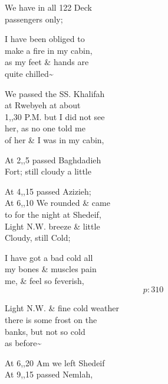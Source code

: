 \documentclass{report}
\begin{document}
	\par{
 	We have in all 122 Deck\ \\passengers only;\ \\
	}

	\par{
 	I have been obliged to\ \\make a fire in my cabin,\ \\as my feet \& hands are\ \\quite chilled\~{}\ \\
	}

	\par{
 	We passed the SS. Khalifah\ \\at Rwebyeh at about\ \\1,,30 P.M. but I did not see\ \\her, as no one told me\ \\of her \& I was in my cabin,\ \\
	}

	\par{
 	At 2,,5 passed Baghdadieh\ \\Fort; still cloudy a little\ \\
	}

	\par{
 	At 4,,15 passed Azizieh;\ \\At 6,,10 We rounded \& came\ \\to for the night at Shedeif,\ \\Light N.W. breeze \& little\ \\Cloudy, still Cold;\ \\
	}

	\par{
 	I have got a bad cold all\ \\my bones \& muscles pain\ \\me, \& feel so feverish,\ \\
  \[p: 310 \]

	}

	\par{
 	Light N.W. \& fine cold weather\ \\there is some frost on the\ \\banks, but not so cold\ \\as before\~{}\ \\
	}

	\par{
 	At 6,,20 Am we left Shedeif\ \\At 9,,15 passed Nemlah,\ \\
	}
\end{document}
